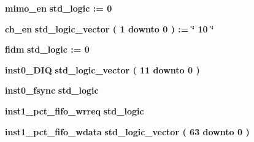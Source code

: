 \begin{DoxyCompactItemize}
\item 
{\bf mimo\+\_\+en} {\bfseries \textcolor{comment}{std\+\_\+logic}\textcolor{vhdlchar}{ }\textcolor{vhdlchar}{ }\textcolor{vhdlchar}{\+:}\textcolor{vhdlchar}{=}\textcolor{vhdlchar}{ }\textcolor{vhdlchar}{ }\textcolor{vhdlchar}{\textquotesingle{}}\textcolor{vhdlchar}{ } \textcolor{vhdldigit}{0} \textcolor{vhdlchar}{ }\textcolor{vhdlchar}{\textquotesingle{}}\textcolor{vhdlchar}{ }} 
\item 
{\bf ch\+\_\+en} {\bfseries \textcolor{comment}{std\+\_\+logic\+\_\+vector}\textcolor{vhdlchar}{ }\textcolor{vhdlchar}{(}\textcolor{vhdlchar}{ }\textcolor{vhdlchar}{ } \textcolor{vhdldigit}{1} \textcolor{vhdlchar}{ }\textcolor{keywordflow}{downto}\textcolor{vhdlchar}{ }\textcolor{vhdlchar}{ } \textcolor{vhdldigit}{0} \textcolor{vhdlchar}{ }\textcolor{vhdlchar}{)}\textcolor{vhdlchar}{ }\textcolor{vhdlchar}{ }\textcolor{vhdlchar}{ }\textcolor{vhdlchar}{\+:}\textcolor{vhdlchar}{=}\textcolor{vhdlchar}{ }\textcolor{vhdlchar}{ }\textcolor{vhdlchar}{ }\textcolor{vhdlchar}{ }\textcolor{keyword}{\char`\"{} 10 \char`\"{}}\textcolor{vhdlchar}{ }} 
\item 
{\bf fidm} {\bfseries \textcolor{comment}{std\+\_\+logic}\textcolor{vhdlchar}{ }\textcolor{vhdlchar}{ }\textcolor{vhdlchar}{\+:}\textcolor{vhdlchar}{=}\textcolor{vhdlchar}{ }\textcolor{vhdlchar}{ }\textcolor{vhdlchar}{\textquotesingle{}}\textcolor{vhdlchar}{ } \textcolor{vhdldigit}{0} \textcolor{vhdlchar}{ }\textcolor{vhdlchar}{\textquotesingle{}}\textcolor{vhdlchar}{ }} 
\item 
{\bf inst0\+\_\+\+D\+IQ} {\bfseries \textcolor{comment}{std\+\_\+logic\+\_\+vector}\textcolor{vhdlchar}{ }\textcolor{vhdlchar}{(}\textcolor{vhdlchar}{ }\textcolor{vhdlchar}{ } \textcolor{vhdldigit}{11} \textcolor{vhdlchar}{ }\textcolor{keywordflow}{downto}\textcolor{vhdlchar}{ }\textcolor{vhdlchar}{ } \textcolor{vhdldigit}{0} \textcolor{vhdlchar}{ }\textcolor{vhdlchar}{)}\textcolor{vhdlchar}{ }} 
\item 
{\bf inst0\+\_\+fsync} {\bfseries \textcolor{comment}{std\+\_\+logic}\textcolor{vhdlchar}{ }} 
\item 
{\bf inst1\+\_\+pct\+\_\+fifo\+\_\+wrreq} {\bfseries \textcolor{comment}{std\+\_\+logic}\textcolor{vhdlchar}{ }} 
\item 
{\bf inst1\+\_\+pct\+\_\+fifo\+\_\+wdata} {\bfseries \textcolor{comment}{std\+\_\+logic\+\_\+vector}\textcolor{vhdlchar}{ }\textcolor{vhdlchar}{(}\textcolor{vhdlchar}{ }\textcolor{vhdlchar}{ } \textcolor{vhdldigit}{63} \textcolor{vhdlchar}{ }\textcolor{keywordflow}{downto}\textcolor{vhdlchar}{ }\textcolor{vhdlchar}{ } \textcolor{vhdldigit}{0} \textcolor{vhdlchar}{ }\textcolor{vhdlchar}{)}\textcolor{vhdlchar}{ }} 

\end{DoxyCompactItemize}
